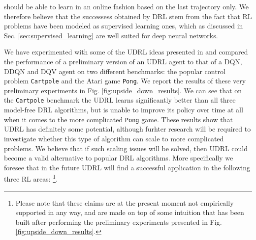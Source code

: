 should be able to learn in an online fashion based on the last trajectory only. We therefore believe that the successess obtained by DRL stem from the fact that RL problems have been modeled as supervised learning ones, which as discussed in Sec. \ref{sec:supervised_learning} are well suited for deep neural networks.

We have experimented with some of the UDRL ideas presented in \cite{schmidhuber2019reinforcement,srivastava2019training} and compared the performance of a preliminary version of an UDRL agent to that of a DQN, DDQN and DQV agent on two different benchmarks: the popular control problem \texttt{Cartpole} and the Atari game \texttt{Pong}. We report the results of these very preliminary experiments in Fig. \ref{fig:upside_down_results}. We can see that on the \texttt{Cartpole} benchmark the UDRL learns significantly better than all three model-free DRL algorithms, but is unable to improve its policy over time at all when it comes to the more complicated \texttt{Pong} game. These results show that UDRL has definitely some potential, although furhter research will be required to investigate whether this type of algorithm can scale to more complicated problems. We believe that if such scaling issues will be solved, then UDRL could become a valid alternative to popular DRL algorithms. More specifically we foresee that in the future UDRL will find a successful application in the following three RL areas: \footnote{Please note that these claims are at the present moment not empirically supported in any way, and are made on top of some intuition that has been built after performing the preliminary experiments presented in Fig. \ref{fig:upside_down_results}.}.



